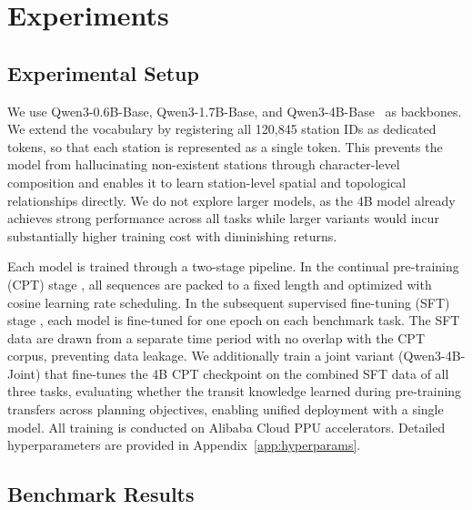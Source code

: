 \documentclass{article}
\begin{document}
\section{Experiments}
\label{sec:experiments}

\subsection{Experimental Setup}
\label{sec:setup}

We use Qwen3-0.6B-Base, Qwen3-1.7B-Base, and Qwen3-4B-Base~\cite{yang2025qwen3} as backbones. We extend the vocabulary by registering all 120,845 station IDs as dedicated tokens, so that each station is represented as a single token. This prevents the model from hallucinating non-existent stations through character-level composition and enables it to learn station-level spatial and topological relationships directly. We do not explore larger models, as the 4B model already achieves strong performance across all tasks while larger variants would incur substantially higher training cost with diminishing returns.

Each model is trained through a two-stage pipeline. In the continual pre-training (CPT) stage \cite{gururangan2020dont}, all sequences are packed to a fixed length and optimized with cosine learning rate scheduling. In the subsequent supervised fine-tuning (SFT) stage \cite{ouyang2022training,wei2022finetuned}, each model is fine-tuned for one epoch on each benchmark task. The SFT data are drawn from a separate time period with no overlap with the CPT corpus, preventing data leakage. We additionally train a joint variant (Qwen3-4B-Joint) that fine-tunes the 4B CPT checkpoint on the combined SFT data of all three tasks, evaluating whether the transit knowledge learned during pre-training transfers across planning objectives, enabling unified deployment with a single model. All training is conducted on Alibaba Cloud PPU accelerators. Detailed hyperparameters are provided in Appendix~\ref{app:hyperparams}.

\subsection{Benchmark Results}
\label{sec:results}
\begingroup
\setlength{\parskip}{0pt}
\end{document}
